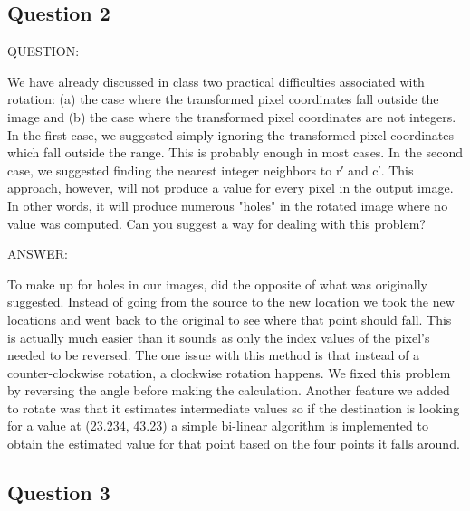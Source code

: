 \documentclass[pdftex, 11pt]{article}
\begin{document}
	\subsection{Question 2}	

		\begin{description}

			\item{QUESTION:}

				We have already discussed in class two practical difficulties associated with rotation: (a) the
				case where the transformed pixel coordinates fall outside the image and (b) the case
				where the transformed pixel coordinates are not integers. In the first case, we suggested simply
				ignoring the transformed pixel coordinates which fall outside the range. This is probably enough
				in most cases. In the second case, we suggested finding the nearest integer neighbors to r′ and c′.
				This approach, however, will not produce a value for every pixel in the output image. In other
				words, it will produce numerous "holes" in the rotated image where no value was computed. Can
				you suggest a way for dealing with this problem?

			\item{ANSWER:}

				To make up for holes in our images, did the opposite of what was originally suggested.  Instead of
				going from the source to the new location we took the new locations and went back to the original
				to see where that point should fall.  This is actually much easier than it sounds as only the
				index values of the pixel's needed to be reversed.  The one issue with this method is that instead
				of a counter-clockwise rotation, a clockwise rotation happens.  We fixed this problem by reversing
				the angle before making the calculation.  Another feature we added to rotate was that it estimates
				intermediate values so if the destination is looking for a value at (23.234, 43.23) a simple
				bi-linear algorithm is implemented to obtain the estimated value for that point based on the four
				points it falls around.

		\end{description}

	\subsection{Question 3}	
\end{document}
